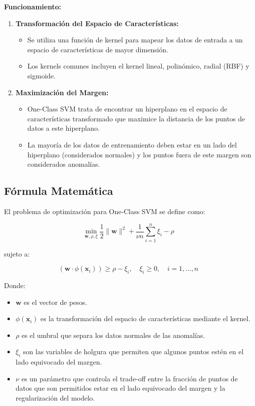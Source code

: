 \textbf{Funcionamiento:}

\begin{enumerate}
    \item \textbf{Transformación del Espacio de Características:}
    \begin{itemize}
        \item Se utiliza una función de kernel para mapear los datos de entrada a un espacio de características de mayor dimensión.
        \item Los kernels comunes incluyen el kernel lineal, polinómico, radial (RBF) y sigmoide.
    \end{itemize}

    \item \textbf{Maximización del Margen:}
    \begin{itemize}
        \item One-Class SVM trata de encontrar un hiperplano en el espacio de características transformado que maximice la distancia de los puntos de datos a este hiperplano.
        \item La mayoría de los datos de entrenamiento deben estar en un lado del hiperplano (considerados normales) y los puntos fuera de este margen son considerados anomalías.
    \end{itemize}
\end{enumerate}

\subsection*{Fórmula Matemática}

El problema de optimización para One-Class SVM se define como:

\[ \min_{\mathbf{w}, \rho, \xi} \frac{1}{2} \|\mathbf{w}\|^2 + \frac{1}{\nu n} \sum_{i=1}^{n} \xi_i - \rho \]

sujeto a:

\[ (\mathbf{w} \cdot \phi(\mathbf{x}_i)) \geq \rho - \xi_i, \quad \xi_i \geq 0, \quad i = 1, \ldots, n \]

Donde:
\begin{itemize}
    \item \( \mathbf{w} \) es el vector de pesos.
    \item \( \phi(\mathbf{x}_i) \) es la transformación del espacio de características mediante el kernel.
    \item \( \rho \) es el umbral que separa los datos normales de las anomalías.
    \item \( \xi_i \) son las variables de holgura que permiten que algunos puntos estén en el lado equivocado del margen.
    \item \( \nu \) es un parámetro que controla el trade-off entre la fracción de puntos de datos que son permitidos estar en el lado equivocado del margen y la regularización del modelo.
\end{itemize}


